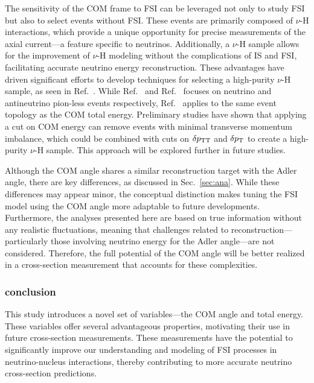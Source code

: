           The sensitivity of the COM frame to FSI can be leveraged not only to study FSI but also to select events without FSI. 
          These events are primarily composed of $\nu$-H interactions, which provide a unique opportunity for precise measurements of the axial current—a feature specific to neutrinos. 
          Additionally, a $\nu$-H sample allows for the improvement of $\nu$-H modeling without the complications of IS and FSI, facilitating accurate neutrino energy reconstruction. 
          These advantages have driven significant efforts to develop techniques for selecting a high-purity $\nu$-H sample, as seen in Ref.~\cite{Lu:2015hea,MINERvA:2023avz,Baudis:2023tma}.
          While Ref.~\cite{Baudis:2023tma} and Ref.~\cite{MINERvA:2023avz} focuses on neutrino and antineutrino pion-less events respectively, Ref.~\cite{Lu:2015hea} applies to the same event topology as the COM total energy. 
          Preliminary studies have shown that applying a cut on COM energy can remove events with minimal transverse momentum imbalance, which could be combined with cuts on $\delta p_\textrm{TT}$ and $\delta p_\textrm{T}$ to create a high-purity $\nu$-H sample. 
          This approach will be explored further in future studies.

          Although the COM angle shares a similar reconstruction target with the Adler angle, there are key differences, as discussed in Sec.~\ref{sec:ana}. 
          While these differences may appear minor, the conceptual distinction makes tuning the FSI model using the COM angle more adaptable to future developments. 
          Furthermore, the analyses presented here are based on true information without any realistic fluctuations, meaning that challenges related to reconstruction—particularly those involving neutrino energy for the Adler angle—are not considered. 
          Therefore, the full potential of the COM angle will be better realized in a cross-section measurement that accounts for these complexities.

          \subsubsection{conclusion}
          This study introduces a novel set of variables—the COM angle and total energy.
          These variables offer several advantageous properties, motivating their use in future cross-section measurements.
          These measurements have the potential to significantly improve our understanding and modeling of FSI processes in neutrino-nucleus interactions, thereby contributing to more accurate neutrino cross-section predictions.

